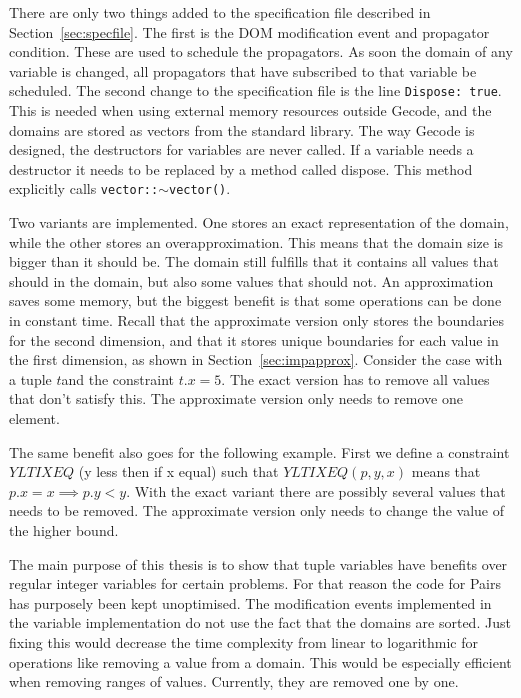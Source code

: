 \documentclass[a4paper,11pt]{article}
\begin{document}
There are only two things added to the specification file described in Section~\ref{sec:specfile}. The first is the DOM modification event and propagator condition. These are used to schedule the propagators. As soon the domain of any variable is changed, all propagators that have subscribed to that variable be scheduled. The second change to the specification file is the line \texttt{Dispose: true}. This is needed when using external memory resources outside Gecode, and the domains are stored as vectors from the standard library. The way Gecode is designed, the destructors for variables are never called. If a variable needs a destructor it needs to be replaced by a method called dispose. This method explicitly calls \texttt{vector::$\sim$vector()}.

Two variants are implemented. One stores an exact representation of the domain, while the other stores an overapproximation. This means that the domain size is bigger than it should be. The domain still fulfills that it contains all values that should in the domain, but also some values that should not. An approximation saves some memory, but the biggest benefit is that some operations can be done in constant time. Recall that the approximate version only stores the boundaries for the second dimension, and that it stores unique boundaries for each value in the first dimension, as shown in Section~\ref*{sec:impapprox}. Consider the case with a tuple $t$and the constraint $t.x=5$. The exact version has to remove all values that don't satisfy this. The approximate version only needs to remove one element. 

The same benefit also goes for the following example. First we define a constraint $YLTIXEQ$ (y less then if x equal) such that $YLTIXEQ(p, y, x)$ means that $p.x=x\implies p.y<y$. With the exact variant there are possibly several values that needs to be removed. The approximate version only needs to change the value of the higher bound.

The main purpose of this thesis is to show that tuple variables have benefits over regular integer variables for certain problems. For that reason the code for Pairs has purposely been kept unoptimised. The modification events implemented in the variable implementation do not use the fact that the domains are sorted. Just fixing this would decrease the time complexity from linear to logarithmic for operations like removing a value from a domain. This would be especially efficient when removing ranges of values. Currently, they are removed one by one.
\end{document}
